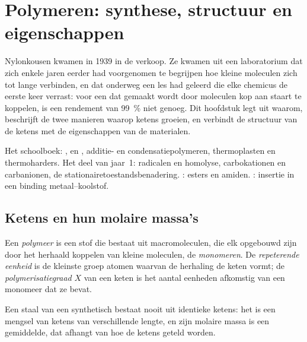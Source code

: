 \chapter{Polymeren: synthese, structuur en eigenschappen}\label{ch:b2:polymer-synthesis}

Nylonkousen kwamen in 1939 in de verkoop. Ze kwamen uit een laboratorium dat zich enkele jaren
eerder had voorgenomen te begrijpen hoe kleine moleculen zich tot lange verbinden, en dat onderweg een
les had geleerd die elke chemicus de eerste keer verrast: voor een  dat gemaakt wordt door moleculen kop aan staart te koppelen,
is een rendement van 99~\% niet genoeg. Dit hoofdstuk legt uit waarom, beschrijft de twee manieren waarop ketens groeien,
en verbindt de structuur van de ketens met de eigenschappen van de materialen.

\begin{recall}
Het schoolboek: ,  en , additie- en condensatiepolymeren,
thermoplasten en thermoharders. Het deel van jaar~1: radicalen en homolyse, carbokationen en
carbanionen, de stationairetoestandsbenadering. : esters en amiden.
: insertie in een binding metaal--koolstof.
\end{recall}

\section{Ketens en hun molaire massa's}

\begin{definition}[Polymeer]\label{def:b2:polymer-synthesis:polymer}
Een \emph{polymeer} is een stof die bestaat uit macromoleculen, die elk opgebouwd zijn door het herhaald
koppelen van kleine moleculen, de \emph{monomeren}. De \emph{repeterende eenheid}
is de kleinste groep atomen waarvan de herhaling de keten vormt; de \emph{polymerisatiegraad}
$X$ van een keten is het aantal eenheden afkomstig van een monomeer
dat ze bevat.
\end{definition}

Een staal van een synthetisch  bestaat nooit uit identieke ketens: het is een mengsel van ketens van
verschillende lengte, en zijn molaire massa is een gemiddelde, dat afhangt van hoe de ketens geteld worden.

